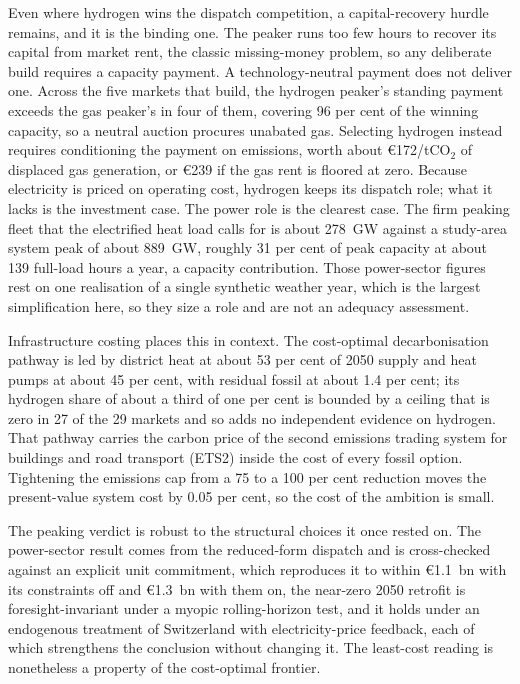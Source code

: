 Even where hydrogen wins the dispatch competition, a capital-recovery hurdle remains, and
it is the binding one. The peaker runs too few hours to recover its capital from market
rent, the classic missing-money problem, so any deliberate build requires a capacity
payment. A technology-neutral payment does not deliver one. Across the five markets that build, the hydrogen peaker's standing payment exceeds the gas peaker's in four of them,
covering 96 per cent of the winning capacity, so a neutral auction procures unabated gas.
Selecting hydrogen instead requires conditioning the payment on emissions, worth about
\euro{}172/tCO$_2$ of displaced gas generation, or \euro{}239 if the gas rent is floored
at zero. Because electricity is priced on operating cost, hydrogen keeps its dispatch
role; what it lacks is the investment case. The power role is the clearest case. The firm peaking fleet
that the electrified heat load calls for is about 278~GW against a study-area system
peak of about 889~GW, roughly 31 per cent of peak capacity at about 139 full-load
hours a year, a capacity contribution. Those power-sector figures rest on one
realisation of a single synthetic weather year, which is the largest simplification
here, so they size a role and are not an adequacy assessment.

Infrastructure costing places this in
context. The cost-optimal decarbonisation pathway is led by district heat at about 53
per cent of 2050 supply and heat pumps at about 45 per cent, with residual fossil at
about 1.4 per cent; its hydrogen share of about a third of one per cent is bounded by a
ceiling that is zero in 27 of the 29 markets and so adds no independent evidence on
hydrogen. That pathway carries the carbon price of the second emissions trading
system for buildings and road transport (ETS2) inside the cost of every fossil option.
Tightening the emissions cap from a 75 to a 100 per cent reduction moves the
present-value system cost by 0.05 per cent, so the cost of the ambition is small.

The
peaking verdict is robust to the structural choices it once rested on. The power-sector result comes from the reduced-form dispatch and is cross-checked
against an explicit unit commitment, which reproduces it to within \euro{}1.1~bn with
its constraints off and \euro{}1.3~bn with them on, the near-zero 2050 retrofit is foresight-invariant under a myopic rolling-horizon test, and it
holds under an endogenous treatment of Switzerland with electricity-price feedback,
each of which strengthens the conclusion without changing it. The least-cost reading
is nonetheless a property of the cost-optimal frontier.

